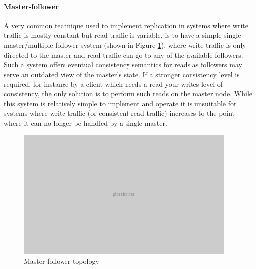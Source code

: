 \paragraph{Master-follower}
A very common technique used to implement replication in systems where write traffic is mostly constant but read traffic is variable, is to have a simple single master/multiple follower system (shown in Figure \ref{fig:master-follower}), where write traffic is only directed to the master and read traffic can go to any of the available followers.
Such a system offers eventual consistency semantics for reads as followers may serve an outdated view of the master's state.
If a stronger consistency level is required, for instance by a client which needs a read-your-writes level of consistency, the only solution is to perform such reads on the master node.
While this system is relatively simple to implement and operate it is unsuitable for systems where write traffic (or consistent read traffic) increases to the point where it can no longer be handled by a single master.

\begin{figure}[h]
\caption{Master-follower topology}
\label{fig:master-follower}
\centering
\includegraphics[width=0.95\textwidth]{images/placeholder.png}
\end{figure}


